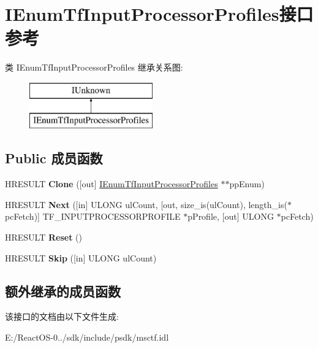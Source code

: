 \hypertarget{interface_i_enum_tf_input_processor_profiles}{}\section{I\+Enum\+Tf\+Input\+Processor\+Profiles接口 参考}
\label{interface_i_enum_tf_input_processor_profiles}
类 I\+Enum\+Tf\+Input\+Processor\+Profiles 继承关系图\+:\begin{figure}[H]
\begin{center}
\leavevmode
\includegraphics[height=2.000000cm]{interface_i_enum_tf_input_processor_profiles}
\end{center}
\end{figure}
\subsection*{Public 成员函数}
\begin{DoxyCompactItemize}
\item 
\mbox{\label{interface_i_enum_tf_input_processor_profiles_a969c6e8b6794108fe5b7fffee2c0dc2a}} 
H\+R\+E\+S\+U\+LT {\bfseries Clone} (\mbox{[}out\mbox{]} \hyperlink{interface_i_enum_tf_input_processor_profiles}{I\+Enum\+Tf\+Input\+Processor\+Profiles} $\ast$$\ast$pp\+Enum)
\item 
\mbox{\label{interface_i_enum_tf_input_processor_profiles_ab9ead6b87aa3402f204e3c3e38b6ad4d}} 
H\+R\+E\+S\+U\+LT {\bfseries Next} (\mbox{[}in\mbox{]} U\+L\+O\+NG ul\+Count, \mbox{[}out, size\+\_\+is(ul\+Count), length\+\_\+is($\ast$pc\+Fetch)\mbox{]} T\+F\+\_\+\+I\+N\+P\+U\+T\+P\+R\+O\+C\+E\+S\+S\+O\+R\+P\+R\+O\+F\+I\+LE $\ast$p\+Profile, \mbox{[}out\mbox{]} U\+L\+O\+NG $\ast$pc\+Fetch)
\item 
\mbox{\label{interface_i_enum_tf_input_processor_profiles_ab2d01bc878d655296749490e20495c44}} 
H\+R\+E\+S\+U\+LT {\bfseries Reset} ()
\item 
\mbox{\label{interface_i_enum_tf_input_processor_profiles_ae56c828e3acb065ed9b4bb05770f3e86}} 
H\+R\+E\+S\+U\+LT {\bfseries Skip} (\mbox{[}in\mbox{]} U\+L\+O\+NG ul\+Count)
\end{DoxyCompactItemize}
\subsection*{额外继承的成员函数}


该接口的文档由以下文件生成\+:\begin{DoxyCompactItemize}
\item 
E\+:/\+React\+O\+S-\/0../sdk/include/psdk/msctf.\+idl\end{DoxyCompactItemize}
